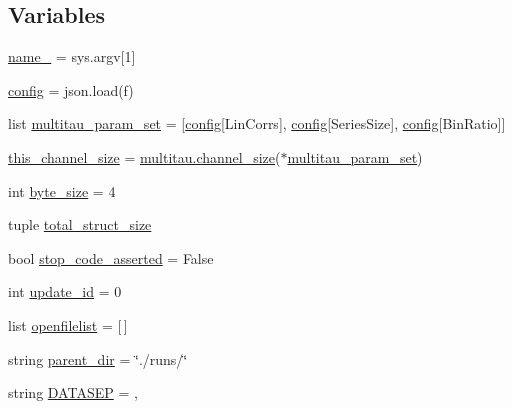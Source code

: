 \subsection*{Variables}
\begin{DoxyCompactItemize}
\item 
\hyperlink{namespacephoton__statistics_a729c361165a662402f88b585477d2ee6}{name\+\_\+} = sys.\+argv\mbox{[}1\mbox{]}
\item 
\hyperlink{namespacephoton__statistics_a4176c548148b1c86da6ddf320ab00e90}{config} = json.\+load(f)
\item 
list \hyperlink{namespacephoton__statistics_a3c57d728c4b1cdcb2b6ca63bc6adfc4d}{multitau\+\_\+param\+\_\+set} = \mbox{[}\hyperlink{namespacephoton__statistics_a4176c548148b1c86da6ddf320ab00e90}{config}\mbox{[}\textquotesingle{}Lin\+Corrs\textquotesingle{}\mbox{]}, \hyperlink{namespacephoton__statistics_a4176c548148b1c86da6ddf320ab00e90}{config}\mbox{[}\textquotesingle{}Series\+Size\textquotesingle{}\mbox{]}, \hyperlink{namespacephoton__statistics_a4176c548148b1c86da6ddf320ab00e90}{config}\mbox{[}\textquotesingle{}Bin\+Ratio\textquotesingle{}\mbox{]}\mbox{]}
\item 
\hyperlink{namespacephoton__statistics_a397f80b778ada9e9d514e3ed06936540}{this\+\_\+channel\+\_\+size} = \hyperlink{namespacemultitau_a1022c52950a892396ac45e7de5379e12}{multitau.\+channel\+\_\+size}($\ast$\hyperlink{namespacephoton__statistics_a3c57d728c4b1cdcb2b6ca63bc6adfc4d}{multitau\+\_\+param\+\_\+set})
\item 
int \hyperlink{namespacephoton__statistics_a12cca295f67eb3583c567d9907a3fe4f}{byte\+\_\+size} = 4
\item 
tuple \hyperlink{namespacephoton__statistics_aa8b4fc62029e126fa660593daaa282f8}{total\+\_\+struct\+\_\+size}
\item 
bool \hyperlink{namespacephoton__statistics_ae06425daaa0688ab0ff42c7619615e1d}{stop\+\_\+code\+\_\+asserted} = False
\item 
int \hyperlink{namespacephoton__statistics_aa0ea01ea8f5c4844ed6c10dbe51d0497}{update\+\_\+id} = 0
\item 
list \hyperlink{namespacephoton__statistics_ad632a8023bd406f2a2486a1c5d3e7832}{openfilelist} = \mbox{[}$\,$\mbox{]}
\item 
string \hyperlink{namespacephoton__statistics_a255f06b87745f05837e1623b921ae692}{parent\+\_\+dir} = \char`\"{}./runs/\char`\"{}
\item 
string \hyperlink{namespacephoton__statistics_ab381c3496e1a3a8d6dae99e66447c10c}{D\+A\+T\+A\+S\+EP} = \textquotesingle{},\textquotesingle{}

\end{DoxyCompactItemize}
